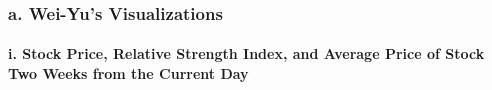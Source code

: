 \documentclass[
]{article}
\begin{document}
\hypertarget{a.-wei-yus-visualizations}{%
\subsubsection{\texorpdfstring{\textbf{a. Wei-Yu's
Visualizations}}{a. Wei-Yu's Visualizations}}\label{a.-wei-yus-visualizations}}

\hypertarget{i.-stock-price-relative-strength-index-and-average-price-of-stock-two-weeks-from-the-current-day}{%
\paragraph{i. Stock Price, Relative Strength Index, and Average Price of
Stock Two Weeks from the Current
Day}\label{i.-stock-price-relative-strength-index-and-average-price-of-stock-two-weeks-from-the-current-day}}
\end{document}
